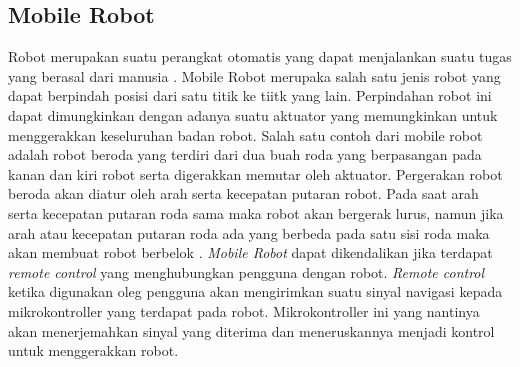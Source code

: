 \subsection{Mobile Robot}
Robot merupakan suatu perangkat otomatis yang dapat menjalankan suatu tugas yang berasal dari manusia \parencite{Desainrobot}.
Mobile Robot merupaka salah satu jenis robot yang dapat berpindah posisi dari satu titik ke tiitk yang lain. Perpindahan robot ini dapat dimungkinkan dengan adanya suatu aktuator yang memungkinkan untuk menggerakkan keseluruhan badan robot. Salah satu contoh dari mobile robot adalah robot beroda yang terdiri dari dua buah roda yang berpasangan pada kanan dan kiri robot serta digerakkan memutar oleh aktuator. Pergerakan robot beroda akan diatur oleh arah serta kecepatan putaran robot. Pada saat arah serta kecepatan putaran roda sama maka robot akan bergerak lurus, namun jika arah atau kecepatan putaran roda ada yang berbeda pada satu sisi roda maka akan membuat robot berbelok \parencite{mobilerobot}. \textit{Mobile Robot} dapat dikendalikan jika terdapat \textit{remote control} yang menghubungkan pengguna dengan robot. \textit{Remote control} ketika digunakan oleg pengguna akan mengirimkan suatu sinyal navigasi kepada mikrokontroller yang terdapat pada robot. Mikrokontroller ini yang nantinya akan menerjemahkan sinyal yang diterima dan meneruskannya menjadi kontrol untuk menggerakkan robot.



